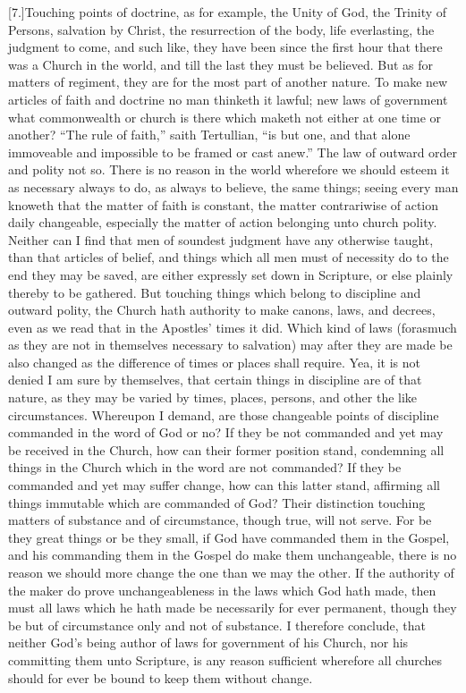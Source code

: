 [7.]Touching points of doctrine, as for example, the Unity  of God, the Trinity of Persons, salvation by Christ, the resurrection of the body, life everlasting, the judgment to come, and such like, they have been since the first hour that there was a Church in the world, and till the last they must be believed. But as for matters of regiment, they are for the most part of another nature. To make new articles of faith and doctrine no man thinketh it lawful; new laws of government what commonwealth or church is there which maketh not either at one time or another? “The rule of faith,” saith Tertullian, “is but one, and that alone immoveable and impossible to be framed or cast anew.” The law of outward order and polity not so. There is no reason in the world wherefore we should esteem it as necessary always to do, as always to believe, the same things; seeing every man knoweth that the matter of faith is constant, the matter contrariwise of action daily changeable, especially the matter of action belonging unto church polity. Neither can I find that men of soundest judgment have any otherwise taught, than that articles of belief, and things which all men must of necessity do to the end they may be saved, are either expressly set down in Scripture, or else plainly thereby to be gathered. But touching things which belong to discipline and outward polity, the Church hath authority to make canons, laws, and decrees, even as we read that in the Apostles’ times it did. Which kind of laws (forasmuch as they are not in themselves necessary to salvation) may after they are made be also changed as the difference of times or places shall require. Yea, it is not denied I am sure by themselves, that certain things in discipline are of that nature, as they may be varied by times, places, persons, and other the like circumstances. Whereupon I demand, are those changeable points of discipline commanded in the word of God or no? If they be not commanded and yet may be  received in the Church, how can their former position stand, condemning all things in the Church which in the word are not commanded? If they be commanded and yet may suffer change, how can this latter stand, affirming all things immutable which are commanded of God? Their distinction touching matters of substance and of circumstance, though true, will not serve. For be they great things or be they small, if God have commanded them in the Gospel, and his commanding them in the Gospel do make them unchangeable, there is no reason we should more change the one than we may the other. If the authority of the maker do prove unchangeableness in the laws which God hath made, then must all laws which he hath made be necessarily for ever permanent, though they be but of circumstance only and not of substance. I therefore conclude, that neither God’s being author of laws for government of his Church, nor his committing them unto Scripture, is any reason sufficient wherefore all churches should for ever be bound to keep them without change.


